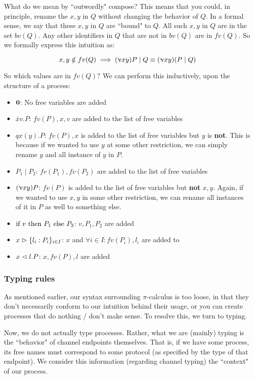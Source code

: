 What do we mean by ``outwordly" compose? This means that you could, in principle, rename the $x,y$ in $Q$ without changing the behavior of $Q$. In a formal sense, we say that these $x,y$ in $Q$ are ``bound" to $Q$. All such $x,y$ in $Q$ are in the set $bv(Q)$. Any other identifiers in $Q$ that are not in $bv(Q)$ are in $fv(Q)$. So we formally express this intuition as:

$$
x,y \notin fv(Q) \implies (\upnu xy)P \mid Q \equiv (\upnu xy)(P \mid Q)
$$


So which values are in $fv(Q)$? We can perform this inductively, upon the structure of a process:

\begin{itemize}
    \item $\textbf{0}$: No free variables are added
    \item $\bar{x}v.P$: $fv(P), x,v$ are added to the list of free variables
    \item $q x(y).P$: $fv(P), x$ is added to the list of free variables but $y$ is \textbf{not}. This is because if we wanted to use $y$ at some other restriction, we can simply rename $y$ and all instance of $y$ in $P$.
    \item $P_1 \mid P_2$: $fv(P_1), fv(P_2)$ are added to the list of free variables
    \item $(\upnu xy)P$: $fv(P)$ is added to the list of free variables but \textbf{not} $x,y$. Again, if we wanted to use $x,y$ in some other restriction, we can rename all instances of it in $P$ as well to something else.
    \item $\text{if } v \text{ then } P_1 \text{ else } P_2$: $v,P_1, P_2$ are added
    \item $x \vartriangleright \{l_i : P_i\}_{i \in I}$: $x$ and $\forall i \in I: fv(P_i), l_i$ are added to
    \item $x \vartriangleleft l.P$: $x, fv(P), l$ are added
\end{itemize}

\subsubsection{Typing rules}
As mentioned earlier, our syntax surrounding $\pi$-calculus is too loose, in that they don't necessarily conform to our intuition behind their usage, or you can create processes that do nothing / don't make sense. To resolve this, we turn to typing.

Now, we do not actually type processes. Rather, what we are (mainly) typing is the ``behavior" of channel endpoints themselves. That is, if we have some process, its free names must correspond to some protocol (as specified by the type of that endpoint). We consider this information (regarding channel typing) the ``context" of our process.

